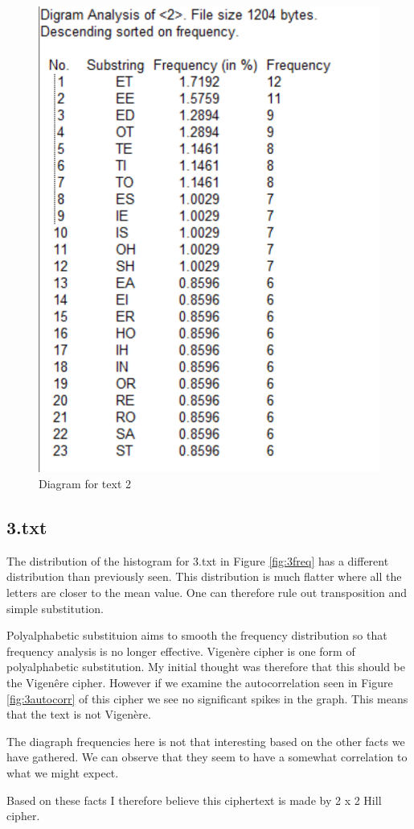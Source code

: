 \begin{figure}[ht!]
    \begin{center}
        \includegraphics[height=0.7\textwidth]{assets/2_diagram.png}
        \caption{Diagram for text 2}
        \label{fig:2diagram}
    \end{center}
\end{figure}

\newpage
\subsection*{3.txt}

The distribution of the histogram for 3.txt in Figure \ref{fig:3freq} has a different distribution than previously seen.
This distribution is much flatter where all the letters are closer to the mean value.
One can therefore rule out transposition and simple substitution.

Polyalphabetic substituion aims to smooth the frequency distribution so that frequency analysis is no longer effective.
Vigenère cipher is one form of polyalphabetic substitution.
My initial thought was therefore that this should be the Vigenêre cipher.
However if we examine the autocorrelation seen in Figure \ref{fig:3autocorr} of this cipher we see no significant spikes in the graph.
This means that the text is not Vigenère.

The diagraph frequencies here is not that interesting based on the other facts we have gathered.
We can observe that they seem to have a somewhat correlation to what we might expect.

Based on these facts I therefore believe this ciphertext is made by 2 x 2 Hill cipher.

